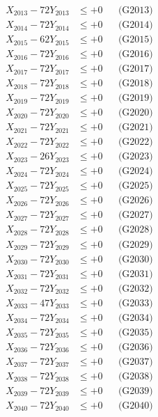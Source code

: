 \documentclass[a4paper,10pt]{article}
\begin{document}
{\begin{align}
X_{2013} - 72Y_{2013} &\leq +0 && \text{(G2013)} \\
X_{2014} - 72Y_{2014} &\leq +0 && \text{(G2014)} \\
X_{2015} - 62Y_{2015} &\leq +0 && \text{(G2015)} \\
X_{2016} - 72Y_{2016} &\leq +0 && \text{(G2016)} \\
X_{2017} - 72Y_{2017} &\leq +0 && \text{(G2017)} \\
X_{2018} - 72Y_{2018} &\leq +0 && \text{(G2018)} \\
X_{2019} - 72Y_{2019} &\leq +0 && \text{(G2019)} \\
X_{2020} - 72Y_{2020} &\leq +0 && \text{(G2020)} \\
\allowbreak
X_{2021} - 72Y_{2021} &\leq +0 && \text{(G2021)} \\
X_{2022} - 72Y_{2022} &\leq +0 && \text{(G2022)} \\
X_{2023} - 26Y_{2023} &\leq +0 && \text{(G2023)} \\
X_{2024} - 72Y_{2024} &\leq +0 && \text{(G2024)} \\
X_{2025} - 72Y_{2025} &\leq +0 && \text{(G2025)} \\
X_{2026} - 72Y_{2026} &\leq +0 && \text{(G2026)} \\
X_{2027} - 72Y_{2027} &\leq +0 && \text{(G2027)} \\
X_{2028} - 72Y_{2028} &\leq +0 && \text{(G2028)} \\
X_{2029} - 72Y_{2029} &\leq +0 && \text{(G2029)} \\
X_{2030} - 72Y_{2030} &\leq +0 && \text{(G2030)} \\
\allowbreak
X_{2031} - 72Y_{2031} &\leq +0 && \text{(G2031)} \\
X_{2032} - 72Y_{2032} &\leq +0 && \text{(G2032)} \\
X_{2033} - 47Y_{2033} &\leq +0 && \text{(G2033)} \\
X_{2034} - 72Y_{2034} &\leq +0 && \text{(G2034)} \\
X_{2035} - 72Y_{2035} &\leq +0 && \text{(G2035)} \\
X_{2036} - 72Y_{2036} &\leq +0 && \text{(G2036)} \\
X_{2037} - 72Y_{2037} &\leq +0 && \text{(G2037)} \\
X_{2038} - 72Y_{2038} &\leq +0 && \text{(G2038)} \\
X_{2039} - 72Y_{2039} &\leq +0 && \text{(G2039)} \\
X_{2040} - 72Y_{2040} &\leq +0 && \text{(G2040)} \\

\end{align}}
\end{document}
